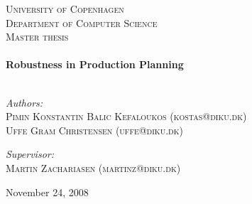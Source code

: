 \begin{titlepage}
 
\begin{center}
 
 
 
\textsc{\LARGE University of Copenhagen \\ Department of Computer Science}\\[1.5cm]
 
\textsc{\Large Master thesis}\\[0.5cm]
 
 
\HRule \\[0.4cm]
{ \huge \bfseries Robustness in Production Planning}\\[0.4cm]
 
\HRule \\[1.5cm]
 
\begin{center} \large
\emph{Authors:}\\
\textsc{Pimin Konstantin Balic Kefaloukos (kostas@diku.dk)}\\
\textsc{Uffe Gram Christensen (uffe@diku.dk)}
\end{center}
\begin{center} \large
\emph{Supervisor:} \\
\textsc{Martin Zachariasen (martinz@diku.dk)}
\end{center}
 
\vfill
 
{\large November 24, 2008}
 
\end{center}
 
\end{titlepage}